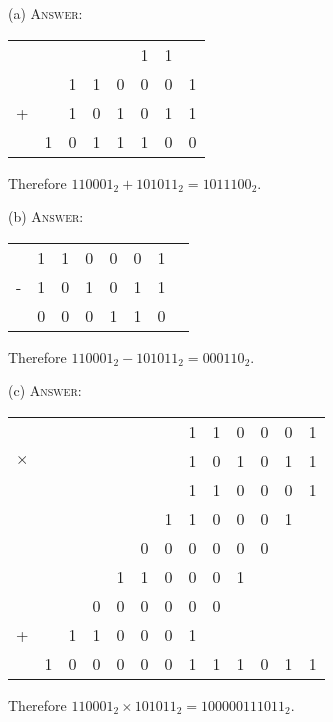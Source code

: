 
(a)
\textsc{Answer:}\vspace{-2mm}
\begin{answerlong}
\begin{longtable}{cccccccc}
  &   &   &   &   & 1 & 1  \\
  &   & 1 & 1 & 0 & 0 & 0 & 1  \\ 
+ &   & 1 & 0 & 1 & 0 & 1 & 1  \\ \hline
  & 1 & 0 & 1 & 1 & 1 & 0 & 0 \\ \hline
\end{longtable}
Therefore $110001_{2} + 101011_{2} = 1011100_{2}$.
\end{answerlong}
  
(b)
\textsc{Answer:}\vspace{-2mm}
\begin{answerlong}
\begin{longtable}{cccccccc}
  & 1 & 1 & 0 & 0 & 0 & 1  \\ 
- & 1 & 0 & 1 & 0 & 1 & 1  \\ \hline
  & 0 & 0 & 0 & 1 & 1 & 0 \\ \hline
\end{longtable}
Therefore $110001_{2} - 101011_{2} = 000110_{2}$.
\end{answerlong}

(c)
\textsc{Answer:}\vspace{-2mm}
\begin{answerlong}
\begin{longtable}{ccccccccccccc}
         &   &   &   &   &   &   & 1 & 1 & 0 & 0 & 0 & 1 \\
$\times$ &   &   &   &   &   &   & 1 & 0 & 1 & 0 & 1 & 1 \\ \hline
         &   &   &   &   &   &   & 1 & 1 & 0 & 0 & 0 & 1 \\
         &   &   &   &   &   & 1 & 1 & 0 & 0 & 0 & 1 &   \\
         &   &   &   &   & 0 & 0 & 0 & 0 & 0 & 0 &   &   \\ 
         &   &   &   & 1 & 1 & 0 & 0 & 0 & 1 &   &   &   \\ 
         &   &   & 0 & 0 & 0 & 0 & 0 & 0 &   &   &   &   \\ 
+        &   & 1 & 1 & 0 & 0 & 0 & 1 &   &   &   &   &   \\ \hline
         & 1 & 0 & 0 & 0 & 0 & 0  & 1 & 1 & 1 & 0 & 1 & 1 \\ \hline
\end{longtable}
Therefore $110001_{2} \times 101011_{2} = 100000111011_{2}$.
\end{answerlong}

